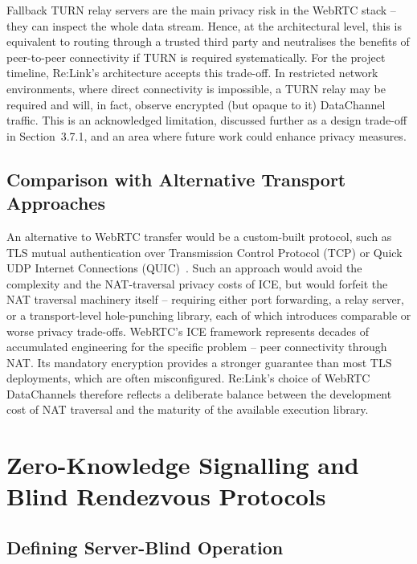 \documentclass[12pt,a4paper,oneside]{report}
\begin{document}
Fallback TURN relay servers are the main privacy risk in the WebRTC stack -- they can inspect the whole data stream. Hence, at the architectural level, this is equivalent to routing through a trusted third party and neutralises the benefits of peer-to-peer connectivity if TURN is required systematically. For the project timeline, Re:Link's architecture accepts this trade-off. In restricted network environments, where direct connectivity is impossible, a TURN relay may be required and will, in fact, observe encrypted (but opaque to it) DataChannel traffic. This is an acknowledged limitation, discussed further as a design trade-off in Section~3.7.1, and an area where future work could enhance privacy measures.


\subsection{Comparison with Alternative Transport Approaches}
\label{sec:alt-transport}

An alternative to WebRTC transfer would be a custom-built protocol, such as TLS mutual authentication over Transmission Control Protocol (TCP) or Quick UDP Internet Connections (QUIC)~\cite{rfc9000}. Such an approach would avoid the complexity and the NAT-traversal privacy costs of ICE, but would forfeit the NAT traversal machinery itself -- requiring either port forwarding, a relay server, or a transport-level hole-punching library, each of which introduces comparable or worse privacy trade-offs. WebRTC's ICE framework represents decades of accumulated engineering for the specific problem -- peer connectivity through NAT. Its mandatory encryption provides a stronger guarantee than most TLS deployments, which are often misconfigured. Re:Link's choice of WebRTC DataChannels therefore reflects a deliberate balance between the development cost of NAT traversal and the maturity of the available execution library.


\section{Zero-Knowledge Signalling and Blind Rendezvous Protocols}
\label{sec:zero-knowledge}

\subsection{Defining Server-Blind Operation}
\label{sec:server-blind}
\end{document}
